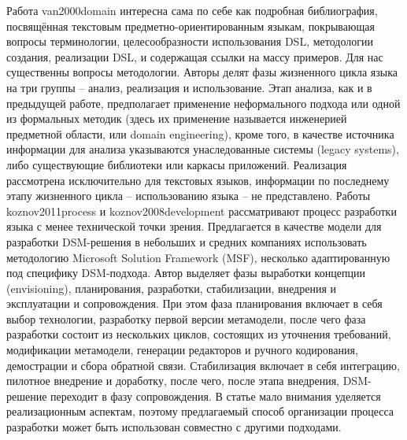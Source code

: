 	Работа van2000domain интересна сама по себе как подробная библиография, посвящённая текстовым предметно-ориентированным языкам, покрывающая вопросы терминологии, целесообразности использования DSL, методологии создания, реализации DSL, и содержащая ссылки на массу примеров. Для нас существенны вопросы методологии. Авторы делят фазы жизненного цикла языка на три группы – анализ, реализация и использование. Этап анализа, как и в предыдущей работе, предполагает применение неформального подхода или одной из формальных методик (здесь их применение называется инженерией предметной области, или domain engineering), кроме того, в качестве источника информации для анализа указываются унаследованные системы (legacy systems), либо существующие библиотеки или каркасы приложений. Реализация рассмотрена исключительно для текстовых языков, информации по последнему этапу  жизненного цикла – использованию языка – не представлено.
	Работы koznov2011process и koznov2008development рассматривают процесс разработки языка с менее технической точки зрения. Предлагается в качестве модели для разработки DSM-решения в небольших и средних компаниях использовать методологию Microsoft Solution Framework (MSF), несколько адаптированную под специфику DSM-подхода. Автор выделяет фазы выработки концепции (envisioning), планирования, разработки, стабилизации, внедрения и эксплуатации и сопровождения. При этом фаза планирования включает в себя выбор технологии, разработку первой версии метамодели, после чего фаза разработки состоит из нескольких циклов, состоящих из уточнения требований, модификации метамодели, генерации редакторов и ручного кодирования, демострации и сбора обратной связи. Стабилизация включает в себя интеграцию, пилотное внедрение и доработку, после чего, после этапа внедрения, DSM-решение переходит в фазу сопровождения. В статье мало внимания уделяется реализационным аспектам, поэтому предлагаемый способ организации процесса разработки может быть использован совместно с другими подходами.
